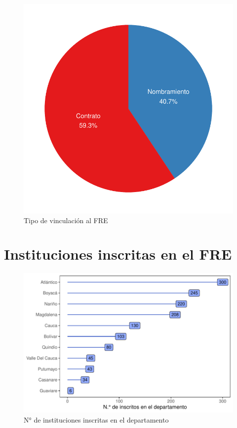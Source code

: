 \documentclass[
]{book}
\begin{document}
\begin{figure}
\includegraphics[width=0.85\linewidth]{InformeFinal_files/figure-latex/pieProfesional2-1} \caption{Tipo de vinculación al FRE}\label{fig:pieProfesional2}
\end{figure}

\hypertarget{instituciones-inscritas-en-el-fre}{%
\section{Instituciones inscritas en el FRE}\label{instituciones-inscritas-en-el-fre}}

\begin{figure}
\includegraphics[width=0.9\linewidth]{InformeFinal_files/figure-latex/institucionesInscritas-1} \caption{N° de instituciones inscritas en el departamento}\label{fig:institucionesInscritas}
\end{figure}
\end{document}
